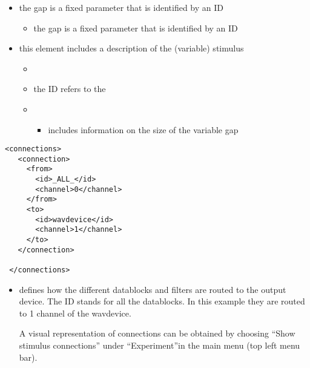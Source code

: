 \begin{itemize}

\item {} the gap is a fixed parameter that
is identified by an ID

\begin{itemize}
\item {} the gap is a fixed parameter that is
identified by an ID
\end{itemize}

\item {} this element includes a description of
the (variable) stimulus

\begin{itemize}
\item {}

\item {} the ID refers to the

\item {}
\begin{itemize}
\item {} includes information on the size of the
variable gap
\end{itemize}

\end{itemize}
\end{itemize}








\begin{lstlisting}
<connections>
   <connection>
     <from>
       <id>_ALL_</id>
       <channel>0</channel>
     </from>
     <to>
       <id>wavdevice</id>
       <channel>1</channel>
     </to>
   </connection>

 </connections>
\end{lstlisting}

 

\begin{itemize}

\item {} defines how the different datablocks
and filters are routed to the output device. The ID 
stands for all the datablocks. In this example they are routed to
1 channel of the wavdevice.

A visual representation of connections can be obtained by choosing
``Show stimulus connections'' under ``Experiment''in the main
\apex menu (top left menu bar).

\end{itemize}

